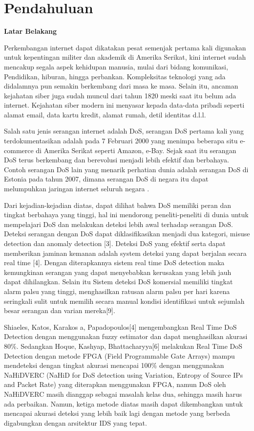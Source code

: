 
\section{Pendahuluan}

\noindent\textbf{Latar Belakang}

Perkembangan internet dapat dikatakan pesat semenjak pertama kali digunakan untuk kepentingan militer dan akademik di Amerika Serikat, kini internet sudah mencakup segala aspek kehidupan manusia, mulai dari bidang komunikasi, Pendidikan, hiburan, hingga perbankan. Kompleksitas teknologi yang ada didalamnya pun semakin berkembang dari masa ke masa. Selain itu, ancaman kejahatan siber juga sudah muncul dari tahun 1820 meski saat itu belum ada internet. Kejahatan siber modern ini menyasar kepada data-data pribadi seperti alamat email, data kartu kredit, alamat rumah, detil identitas d.l.l.

Salah satu jenis serangan internet adalah DoS, serangan DoS pertama kali yang terdokumentasikan adalah pada 7 Februari 2000 yang menimpa beberapa situ e-commerce di Amerika Serikat seperti Amazon, e-Bay. Sejak saat itu serangan DoS terus berkembang dan berevolusi menjadi lebih efektif  dan berbahaya. Contoh serangan DoS lain yang menarik perhatian dunia adalah serangan DoS di Estonia pada tahun 2007, dimana serangan DoS di negara itu dapat melumpuhkan jaringan internet seluruh negara \cite{politicsofddos}.

Dari kejadian-kejadian diatas, dapat dilihat bahwa DoS memiliki peran dan tingkat berbahaya yang tinggi, hal ini mendorong peneliti-peneliti di dunia untuk mempelajari DoS dan melakukan deteksi lebih awal terhadap serangan DoS. Deteksi serangan dengan DoS dapat diklasifikasikan menjadi dua kategori, misuse detection dan anomaly detection [3]. Deteksi DoS yang efektif serta dapat memberikan jaminan kemanan adalah system deteksi yang dapat berjalan secara real time [4]. Dengan diterapkannya sistem real time DoS detection maka kemungkinan serangan yang dapat menyebabkan kerusakan yang lebih jauh dapat dihilangkan. Selain itu Sistem deteksi DoS komersial memiliki tingkat alarm palsu yang tinggi, menghasilkan ratusan alarm palsu per hari karena seringkali sulit untuk memilih secara manual kondisi identifikasi untuk sejumlah besar serangan dan varian mereka[9].

Shiaeles, Katos, Karakos a, Papadopoulos[4] mengembangkan Real Time DoS Detection dengan menggunakan fuzzy estimator dan dapat menghasilkan akurasi 80\%. Sedangkan Hoque, Kashyap, Bhattacharyya[6] melakukan Real Time DoS Detection dengan metode FPGA (Field Programmable Gate Arrays) mampu mendeteksi dengan tingkat akurasi mencapai 100\% dengan menggunakan NaHiDVERC (NaHiD for DoS detection using Variation, Entropy of Source IPs and Packet Rate) yang diterapkan menggunakan FPGA, namun DoS oleh NaHiDVERC masih dianggap sebagai masalah kelas dua, sehingga masih harus ada perbaikan. Namun, ketiga metode diatas masih dapat dikembangkan untuk mencapai akurasi deteksi yang lebih baik lagi dengan metode yang berbeda digabungkan dengan arsitektur IDS yang tepat.

